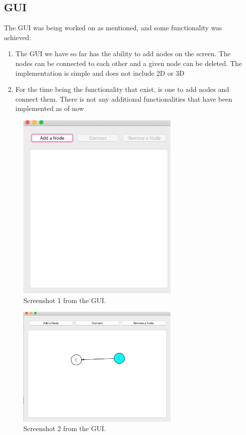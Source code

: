 \subsection{GUI}
The GUI was being worked on as mentioned, and some functionality was achieved:
\begin{enumerate}
    \item The GUI we have so far has the ability to add nodes on the screen. The nodes can be connected to each other and a given node can be deleted. The implementation is simple and does not include 2D or 3D
    \item For the time being the functionality that exist, is one to add nodes and connect them. There is not any additional functionalities that have been implemented as of now
\end{enumerate}

\begin{figure}[!htbp]
\begin{center}
	\includegraphics[width=8cm]{Screenshot 2020-08-27 at 14.03.23.png}
    \caption{Screenshot 1 from the GUI.}
	\label{img:gui-1}			%
\end{center}
\end{figure}

\begin{figure}[!htbp]
\begin{center}
	\includegraphics[width=8cm]{Screenshot 2020-08-27 at 14.03.42.png}
    \caption{Screenshot 2 from the GUI.}
	\label{img:gui-2}			%
\end{center}
\end{figure}

